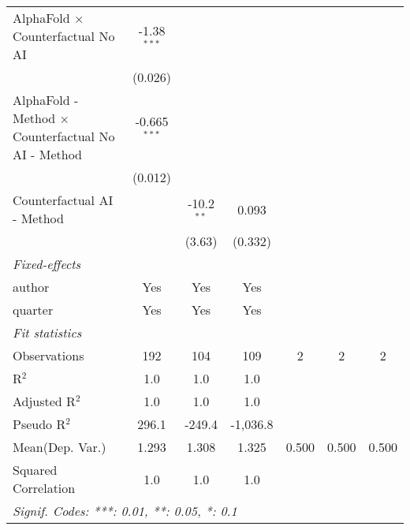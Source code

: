 \begin{tabular}{lcccccc}
   AlphaFold $\times$ Counterfactual No AI                    & -1.38$^{***}$  &                &                &     &     &   \\   
                                                              & (0.026)        &                &                &     &     &   \\   
   AlphaFold - Method $\times$ Counterfactual No AI - Method  & -0.665$^{***}$ &                &                &     &     &   \\   
                                                              & (0.012)        &                &                &     &     &   \\   
   Counterfactual AI - Method                                 &                & -10.2$^{**}$   & 0.093          &     &     &   \\   
                                                              &                & (3.63)         & (0.332)        &     &     &   \\   
   \midrule
   \emph{Fixed-effects}\\
   author                                                     & Yes            & Yes            & Yes            &     &     & \\  
   quarter                                                    & Yes            & Yes            & Yes            &     &     & \\  
   \midrule
   \emph{Fit statistics}\\
   Observations                                               & 192            & 104            & 109            & 2   & 2   & 2\\  
   R$^2$                                                      & 1.0            & 1.0            & 1.0            &     &     & \\  
   Adjusted R$^2$                                             & 1.0            & 1.0            & 1.0            &     &     & \\  
   Pseudo R$^2$                                               & 296.1          & -249.4         & -1,036.8       &     &     & \\  
Mean(Dep. Var.) & 1.293 & 1.308 & 1.325 & 0.500 & 0.500 & 0.500 \\
   Squared Correlation                                        & 1.0            & 1.0            & 1.0            &     &     & \\  
   \midrule \midrule
   \multicolumn{7}{l}{\emph{Signif. Codes: ***: 0.01, **: 0.05, *: 0.1}}\\
\end{tabular}
\par\endgroup
